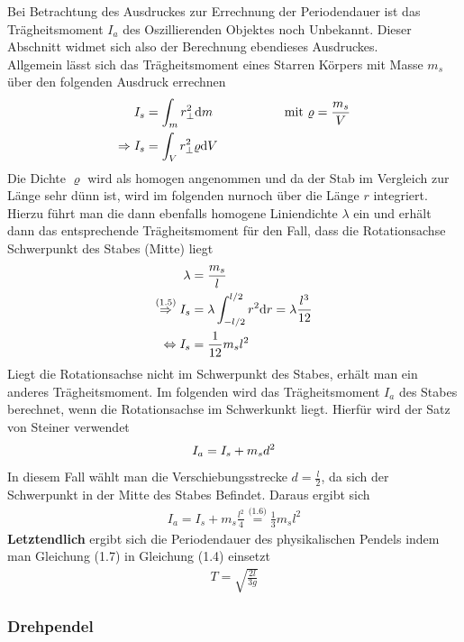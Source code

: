 \documentclass[11pt,a4paper]{article}
\begin{document}
Bei Betrachtung des Ausdruckes zur Errechnung der Periodendauer ist das Trägheitsmoment $I_a$ des Oszillierenden Objektes noch Unbekannt. Dieser Abschnitt widmet sich also der Berechnung ebendieses Ausdruckes.\\

Allgemein lässt sich das Trägheitsmoment eines Starren Körpers mit Masse $m_s$ über den folgenden Ausdruck errechnen
\begin{align}
	I_s &= \int_{m}^{}  r^2_\perp \mathrm{d}m  \hspace{2cm}\text{mit  }  \varrho = \frac{m_s}{V} \notag\\
	\Rightarrow I_s &= \int_{V}^{} r^2_\perp \varrho \mathrm{d}V
\end{align}
Die Dichte $\varrho$ wird als homogen angenommen und da der Stab im Vergleich zur Länge sehr dünn ist, wird im folgenden nurnoch über die Länge $r$ integriert. Hierzu führt man die dann ebenfalls homogene Liniendichte $\lambda$ ein und erhält dann das entsprechende Trägheitsmoment für den Fall, dass die Rotationsachse Schwerpunkt des Stabes (Mitte) liegt
\begin{align}
	\lambda &= \frac{m_s}{l} \notag \\
	\overset{\text{(1.5)}}{\underset{\text{ }}{\Rightarrow}} I_s &= \lambda\int_{-l/2}^{l/2} r^2 \mathrm{d}r = \lambda \frac{l^3}{12}\notag \\
	\Leftrightarrow I_s &= \frac{1}{12} m_s l^2
\end{align}
Liegt die Rotationsachse nicht im Schwerpunkt des Stabes, erhält man ein anderes Trägheitsmoment. Im folgenden wird das Trägheitsmoment $I_a$ des Stabes berechnet, wenn die Rotationsachse im Schwerkunkt liegt. Hierfür wird der Satz von Steiner verwendet
\begin{align}
	I_a = I_s + m_s d^2 \notag
\end{align}
	In diesem Fall wählt man die Verschiebungsstrecke $d=\frac{l}{2}$, da sich der Schwerpunkt in der Mitte des Stabes Befindet. Daraus ergibt sich
\begin{align}
	 I_a = I_s +m_s \frac{l^2}{4}  \overset{\text{(1.6)}}{=} \frac{1}{3} m_s l^2
\end{align}
{\bf Letztendlich} ergibt sich die Periodendauer des physikalischen Pendels indem man Gleichung (1.7) in Gleichung (1.4) einsetzt
\begin{align}
	T = \sqrt{\frac{2l}{3g}}
\end{align}
       \subsubsection{Drehpendel}
\end{document}
